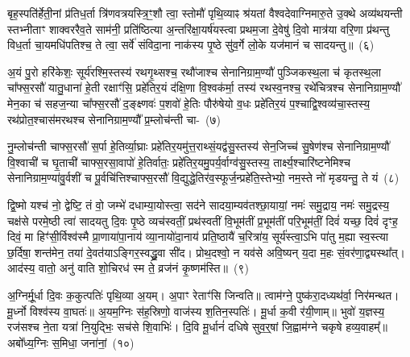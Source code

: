 बृह॒स्पति॑र्\mbox{}हेती॒नां प्र॑तिध॒र्ता त्रि॑णवत्रयस्त्रि॒ꣳ॒शौ त्वा॒ स्तोमौ॑ पृथि॒व्याꣴ श्र॑यतां वैश्वदेवाग्निमारु॒ते उ॒क्थे अव्य॑थयन्ती स्तभ्नीताꣳ शाक्वररैव॒ते साम॑नी॒ प्रति॑ष्ठित्या अ॒न्तरि॑क्षा॒यर्\mbox{}ष॑यस्त्वा प्रथम॒जा दे॒वेषु॑ दि॒वो मात्र॑या वरि॒णा प्र॑थन्तु विध॒र्ता चा॒यमधि॑\-पतिश्च॒ ते त्वा॒ सर्वे॑ संविदा॒ना नाक॑स्य पृ॒ष्ठे सु॑व॒र्गे लो॒के यज॑मानं च सादयन्तु॥~(६)\ip

{\anuvakamend[{प्र॒तीची॒ दिङ्म॒रुत॑स्ते दे॒वा अधि॑पतयश्चत्वारि॒ꣳ॒शच्च॑}]}

अ॒यं पु॒रो हरि॑केशः॒ सूर्य॑रश्मि॒स्तस्य॑ रथगृ॒थ्सश्च॒ रथौ॑जाश्च सेनानिग्राम॒ण्यौ॑ पुञ्जिकस्थ॒ला च॑ कृतस्थ॒ला चा᳚फ्स॒रसौ॑ यातु॒धाना॑ हे॒ती रक्षाꣳ॑सि॒ प्रहे॑तिर॒यं द॑क्षि॒णा वि॒श्वक॑र्मा॒ तस्य॑ रथस्व॒नश्च॒ रथे॑चित्रश्च सेनानिग्राम॒ण्यौ॑ मेन॒का च॑ सहज॒न्या चा᳚फ्स॒रसौ॑ द॒ङ्क्ष्णवः॑ प॒शवो॑ हे॒तिः पौरु॑षेयो व॒धः प्रहे॑तिर॒यं प॒श्चाद्वि॒श्वव्य॑चा॒स्तस्य॒ रथ॑प्रोत॒श्चास॑मरथश्च सेनानिग्राम॒ण्यौ᳚ प्र॒म्लोच॑न्ती चा-~(७)\ip

नु॒म्लोच॑न्ती चाफ्स॒रसौ॑ स॒र्पा हे॒तिर्व्या॒घ्राः प्रहे॑तिर॒यमु॑त्त॒राथ्\-सं॒यद्व॑सु॒स्तस्य॑ सेन॒जिच्च॑ सु॒षेण॑श्च सेनानिग्राम॒ण्यौ॑ वि॒श्वाची॑ च घृ॒ताची॑ चाफ्स॒रसा॒वापो॑ हे॒तिर्वातः॒ प्रहे॑ति\-र॒यमु॒पर्य॒र्वाग्व॑सु॒स्तस्य॒ तार्क्ष्य॒श्चारि॑ष्टनेमिश्च सेनानिग्राम॒ण्या॑\-वु॒र्वशी॑ च पू॒र्वचि॑त्तिश्चाफ्स॒रसौ॑ वि॒द्युद्धे॒तिर॑व॒स्फूर्ज॒न्प्रहे॑ति॒स्तेभ्यो॒ नम॒स्ते नो॑ मृडयन्तु॒ ते यं~(८)\ip

द्वि॒ष्मो यश्च॑ नो॒ द्वेष्टि॒ तं वो॒ जम्भे॑ दधाम्या॒योस्त्वा॒ सद॑ने सादया॒म्यव॑तश्छा॒यायां॒ नमः॑ समु॒द्राय॒ नमः॑ समु॒द्रस्य॒ चक्ष॑से परमे॒ष्ठी त्वा॑ सादयतु दि॒वः पृ॒ष्ठे व्यच॑स्वतीं॒ प्रथ॑स्वतीं वि॒भूम॑तीं प्र॒भूम॑तीं परि॒भूम॑तीं॒ दिवं॑ यच्छ॒ दिवं॑ दृꣳह॒ दिवं॒ मा हिꣳ॑सी॒र्विश्व॑स्मै प्रा॒णाया॑पा॒नाय॑ व्या॒नायो॑दा॒नाय॑ प्रति॒ष्ठायै॑ च॒रित्रा॑य॒ सूर्य॑स्त्वा॒ऽभि पा॑तु म॒ह्या स्व॒स्त्या छ॒र्दिषा॒ शन्त॑मेन॒ तया॑ दे॒वत॑या\-ऽ\-ङ्गिर॒स्वद्ध्रु॒वा सी॑द। प्रोथ॒दश्वो॒ न यव॑से अवि॒ष्यन् य॒दा म॒हः सं॒वर॑णा॒द्व्यस्था᳚त्। आद॑स्य॒ वातो॒ अनु॑ वाति शो॒चिरध॑ स्म ते॒ व्रज॑नं कृ॒ष्णम॑स्ति॥~(९)\ip

{\anuvakamend[{प्र॒म्लोच॑न्ती च॒ यꣴ स्व॒स्त्याष्टाविꣳ॑शतिश्च}]}

अ॒ग्निर्मू॒र्धा दि॒वः क॒कुत्पतिः॑ पृथि॒व्या अ॒यम्। अ॒पाꣳ रेताꣳ॑सि जिन्वति॥ त्वाम॑ग्ने॒ पुष्क॑रा॒दध्यथ॑र्वा॒ निर॑मन्थत। मू॒र्ध्नो विश्व॑स्य वा॒घतः॑॥ अ॒यम॒ग्निः स॑ह॒स्रिणो॒ वाज॑स्य श॒तिन॒स्पतिः॑। मू॒र्धा क॒वी र॑यी॒णाम्॥ भुवो॑ य॒ज्ञस्य॒ रज॑सश्च ने॒ता यत्रा॑ नि॒युद्भिः॒ सच॑से शि॒वाभिः॑। दि॒वि मू॒र्धानं॑ दधिषे सुव॒र्॒\mbox{}षां जि॒ह्वाम॑ग्ने चकृषे हव्य॒वाहम्᳚॥ अबो᳚ध्य॒ग्निः स॒मिधा॒ जना॑नां॒~(१०)\ip

